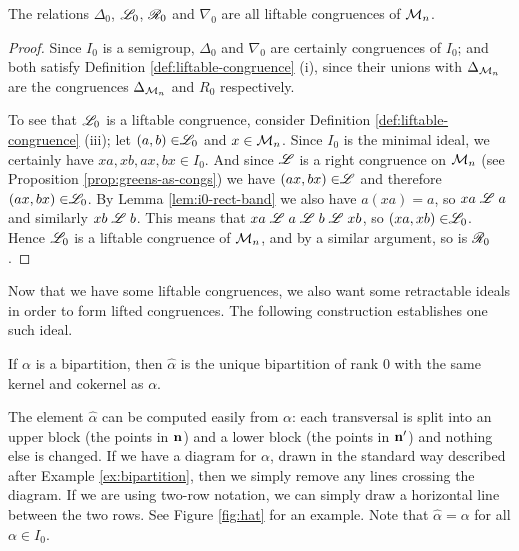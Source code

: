 \begin{proposition}
  The relations $\Delta_0$, $\mathrel{\mathscr{L}}_0$, $\mathrel{\mathscr{R}}_0$ and $\nabla_0$ are all
  liftable congruences of $\mathcal{M}_n$.
  \begin{proof}
    Since $I_0$ is a semigroup, $\Delta_0$ and $\nabla_0$ are certainly
    congruences of $I_0$; and both satisfy Definition
    \ref{def:liftable-congruence} (i), since their unions with $\Delta_{\mathcal{M}_n}$
    are the congruences $\Delta_{\mathcal{M}_n}$ and $R_0$ respectively.

    To see that $\mathrel{\mathscr{L}}_0$ is a liftable congruence, consider Definition
    \ref{def:liftable-congruence} (iii); let $(a,b) \in \mathrel{\mathscr{L}}_0$ and
    $x \in \mathcal{M}_n$.  Since $I_0$ is the minimal ideal, we certainly have
    $xa,xb,ax,bx \in I_0$.  And since $\mathrel{\mathscr{L}}$ is a right congruence on $\mathcal{M}_n$
    (see Proposition \ref{prop:greens-as-congs}) we have $(ax,bx) \in \mathrel{\mathscr{L}}$ and
    therefore $(ax,bx) \in \mathrel{\mathscr{L}}_0$.  By Lemma \ref{lem:i0-rect-band} we also have
    $a(xa) = a$, so $xa \mathrel{\mathscr{L}} a$ and similarly $xb \mathrel{\mathscr{L}} b$.  This means that
    $xa \mathrel{\mathscr{L}} a \mathrel{\mathscr{L}} b \mathrel{\mathscr{L}} xb$, so $(xa, xb) \in \mathrel{\mathscr{L}}_0$.  Hence $\mathrel{\mathscr{L}}_0$ is a
    liftable congruence of $\mathcal{M}_n$, and by a similar argument, so is $\mathrel{\mathscr{R}}_0$.
  \end{proof}
\end{proposition}

Now that we have some liftable congruences, we also want some retractable ideals
in order to form lifted congruences.  The following construction establishes one
such ideal.

\begin{definition}
  \label{def:mn-hat}
  If $\alpha$ is a bipartition, then $\widehat\alpha$ is the unique bipartition
  of rank $0$ with the same kernel and cokernel as $\alpha$.
\end{definition}

The element $\widehat\alpha$ can be computed easily from $\alpha$: each
transversal is split into an upper block (the points in $\mathbf{n}$) and a lower block
(the points in $\mathbf{n}'$) and nothing else is changed.  If we have a diagram for
$\alpha$, drawn in the standard way described after Example
\ref{ex:bipartition}, then we simply remove any lines crossing the diagram.  If
we are using two-row notation, we can simply draw a horizontal line between the
two rows.  See Figure \ref{fig:hat} for an example.  Note that $\widehat\alpha =
\alpha$ for all $\alpha \in I_0$.


